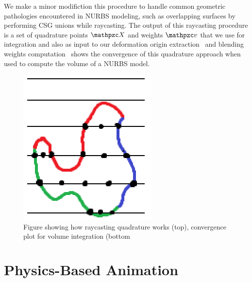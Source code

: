 We make a minor modifiction this procedure to handle common geometric pathologies encountered in NURBS modeling, such as overlapping surfaces by performing 
CSG unions while raycasting. 
The output of this raycasting procedure is a set of quadrature points $\st{X}$ and weights $\st{v}$ that we use for integration and also as input to our 
deformation origin extraction~ and blending weights computation~
 shows the convergence of this quadrature approach when used to compute the volume of a NURBS model.
\begin{figure}
    \includegraphics[width=\columnwidth]{figures/raycasting_quadrature}
    \caption{Figure showing how raycasting quadrature works (top), convergence plot for volume integration (bottom}
    \label{fig:raycasting}
\end{figure}

\section{Physics-Based Animation}

